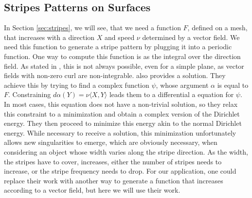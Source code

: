 \documentclass{utue} %
\begin{document}
\subsection{Stripes Patterns on Surfaces}
In Section \ref{sec:stripes}, we will see, that we need a function $F$, defined on a mesh, that increases with a direction $X$ and speed $\nu$ determined by a vector field. We need this function to generate a stripe pattern by plugging it into a periodic function. One way to compute this function is as the integral over the direction field. As stated in \cite{stripes}, this is not always possible, even for a simple plane, as vector fields with non-zero curl are non-integrable. \cite{stripes} also provides a solution. They achieve this by trying to find a complex function $\psi$, whose argument $\alpha$ is equal to $F$. Constraining $d\alpha(Y) = \nu\langle X,Y\rangle$ leads them to a differential a equation for $\psi$. In most cases, this equation does not have a non-trivial solution, so they relax this constraint to a minimization and obtain a complex version of the Dirichlet energy. They then proceed to minimize this energy akin to the normal Dirichlet energy. While necessary to receive a solution, this minimization unfortunately allows new singularities to emerge, which are obviously necessary, when considering an object whose width varies along the stripe direction. As the width, the stripes have to cover, increases, either the number of stripes needs to increase, or the stripe frequency needs to drop. For our application, one could replace their work with another way to generate a function that increases according to a vector field, but here we will use their work.
\end{document}
